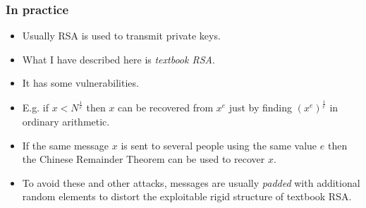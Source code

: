\documentclass[handout]{beamer}
\begin{document}
\begin{frame}
\frametitle{In practice}
\begin{itemize}
\item Usually RSA is used to transmit private keys.
\item What I have described here is \emph{textbook RSA}.
\item It has some vulnerabilities.
\item E.g. if $x<N^{\frac{1}{e}}$ then $x$ can be recovered from $x^e$ just by finding $(x^e)^{\frac{1}{e}}$ in ordinary arithmetic.
\item If the same message $x$ is sent to several people using the same value $e$ then the Chinese Remainder Theorem can be used to recover $x$.
\item To avoid these and other attacks, messages are usually \emph{padded} with additional random elements to distort the exploitable rigid structure of textbook RSA. 
\end{itemize}
\end{frame}
\end{document}
